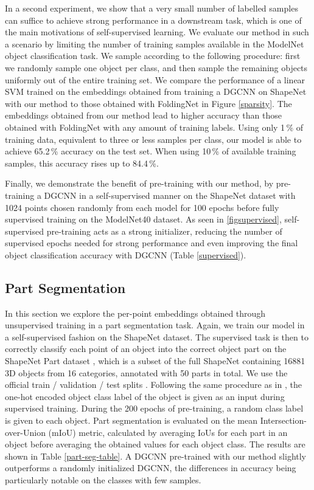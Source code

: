 \documentclass{article}
\begin{document}
In a second experiment, we show that a very small number of labelled samples can suffice to achieve strong performance in a downstream task, which is one of the main motivations of self-supervised learning. We evaluate our method in such a scenario by limiting the number of training samples available in the ModelNet object classification task. We sample according to the following procedure: first we randomly sample one object per class, and then sample the remaining objects uniformly out of the entire training set. We compare the performance of a linear SVM trained on the embeddings obtained from training a DGCNN on ShapeNet with our method to those obtained with FoldingNet \cite{foldingnet} in Figure \ref{sparsity}. The embeddings obtained from our method lead to higher accuracy than those obtained with FoldingNet with any amount of training labels. Using only 1\,\% of training data, equivalent to three or less samples per class, our model is able to achieve 65.2\,\% accuracy on the test set. When using 10\,\% of available training samples, this accuracy rises up to 84.4\,\%. 

Finally, we demonstrate the benefit of pre-training with our method, by pre-training a DGCNN in a self-supervised manner on the ShapeNet dataset with 1024 points chosen randomly from each model for 100 epochs before fully supervised training on the ModelNet40 dataset. As seen in \ref{figsupervised}, self-supervised pre-training acts as a strong initializer, reducing the number of supervised epochs needed for strong performance and even improving the final object classification accuracy with DGCNN (Table \ref{supervised}).



\subsection{Part Segmentation}

In this section we explore the per-point embeddings obtained through unsupervised training in a part segmentation task. Again, we train our model in a self-supervised fashion on the ShapeNet dataset. The supervised task is then to correctly classify each point of an object into the correct object part on the ShapeNet Part dataset \cite{shapenet_part}, which is a subset of the full ShapeNet containing 16881 3D objects from 16 categories, annotated with 50 parts in total. We use the official train / validation / test splits \cite{shapenet_part}. Following the same procedure as in \cite{pointnet, pointnet++, dgcnn}, the one-hot encoded object class label of the object is given as an input during supervised training. During the 200 epochs of pre-training, a random class label is given to each object. Part segmentation is evaluated on the mean Intersection-over-Union (mIoU) metric, calculated by averaging IoUs for each part in an object before averaging the obtained values for each object class. The results are shown in Table \ref{part-seg-table}. A DGCNN pre-trained with our method slightly outperforms a randomly initialized DGCNN, the differences in accuracy being particularly notable on the classes with few samples.
\end{document}
